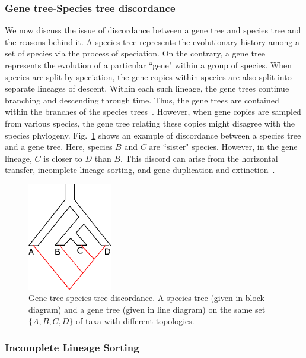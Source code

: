 \subsubsection{Gene tree-Species tree discordance}
We now discuss the issue of discordance between a gene tree and species tree and the reasons behind it. A species tree represents the evolutionary history among a set of species via the process of speciation. On the contrary, a gene tree represents the evolution of a particular ``gene" within a group of species. When species are split by speciation, the gene copies within species are also split into separate lineages of descent.  Within each such lineage, the gene trees continue branching and descending through time. Thus, the gene trees are contained within the branches of the species trees~\cite{maddison1997gene}.
However, when gene copies are sampled from various species, the gene tree relating these copies might disagree with the species phylogeny. Fig.~\ref{fig:discordance} shows an example of discordance between a species tree and a gene tree. Here, species $B$ and $C$ are ``sister" species. However, in the gene lineage, $C$ is closer to $D$ than $B$. This discord can arise from the horizontal transfer, incomplete lineage sorting, and gene duplication and extinction~\cite{maddison1997gene}. 

\begin{figure}[!tb]
	\centering
	\includegraphics[width=0.33\textwidth]{Figure/discordance.eps}
	\caption{Gene tree-species tree discordance. A species tree (given in block diagram) and a gene tree (given in line diagram) on the same set $\{A,B,C,D\}$ of taxa with different topologies.}
	\label{fig:discordance}
\end{figure}



\subsubsection{Incomplete Lineage Sorting}

